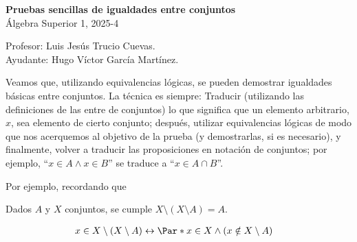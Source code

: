 \documentclass[letterpaper,DIV=12,headsepline,12pt]{scrartcl}
\makeatletter
\renewenvironment{proof}[1][]{%
        \par\pushQED{\qed}%
        \normalfont\topsep6pt \partopsep0pt %
        \trivlist
        \item[\hskip\labelsep
                \textbf{\textit{Demostración.}}%
        ]#1
        }{%
        \popQED\endtrivlist\@endpefalse
    }
\makeatother
\begin{document}
    \thispagestyle{beginstyle}
    \begin{center}
        {\fontsize{30}{60}\rmfamily \textbf{Pruebas sencillas de igualdades entre conjuntos}} \\ \vspace{.2cm}
        Álgebra Superior 1, 2025-4
    \end{center}
    \begin{flushright}
        \footnotesize \hfill Profesor: Luis Jesús Trucio Cuevas.\\
        \hfill Ayudante: Hugo Víctor García Martínez.
    \end{flushright}

    Veamos que, utilizando equivalencias lógicas, se pueden demostrar igualdades básicas entre conjuntos. La técnica es siempre: Traducir (utilizando las definiciones de las entre de conjuntos) lo que significa que un elemento arbitrario, \(x\), sea elemento de cierto conjunto; después, utilizar equivalencias lógicas de modo que nos acerquemos al objetivo de la prueba (y demostrarlas, si es necesario), y finalmente, volver a traducir las proposiciones en notación de conjuntos; por ejemplo, ``\(x \in A \land x \in B\)'' se traduce a ``\(x \in A \cap B\)''.

    Por ejemplo, recordando que

    \begin{proposicion}
        Dados \(A\) y \(X\) conjuntos, se cumple \(X \setminus (X \setminus A) = A\).
    \end{proposicion}
    \begin{proof}
        \begin{align}
            x \in X \setminus (X \setminus A) & \leftrightarrow \Par*{x \in X \land (x \notin X \setminus A)}
        \end{align}
    \end{proof}
\end{document}
